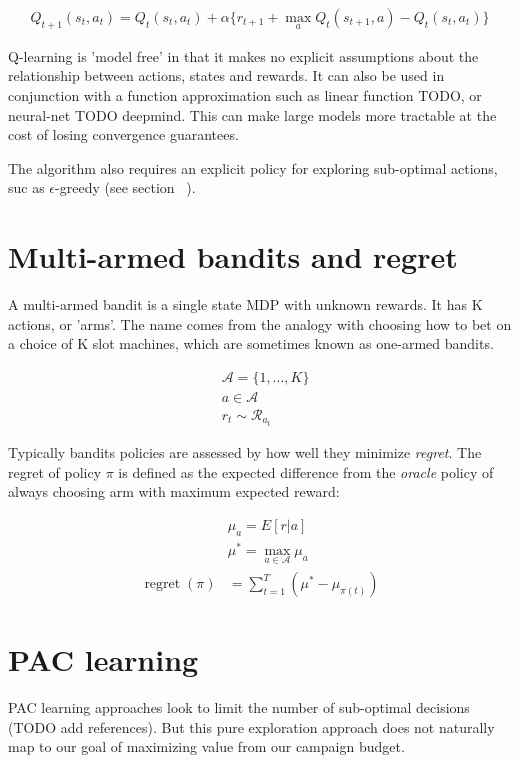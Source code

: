 \documentclass[11pt,a4,singlespacing,titlepagenumber=on]{scrreprt}
\numberwithin{equation}{chapter} %
\theoremstyle{remark}
\begin{document}
\begin{align}
Q_{t+1}(s_t,a_t) = Q_t(s_t,a_t) + \alpha\{r_{t+1} + \max_a Q_t(s_{t+1},a) -Q_t(s_t,a_t)\}
\end{align}

Q-learning is 'model free' in that it makes no explicit assumptions about the relationship between actions, states and rewards. It can also be used in conjunction with a function approximation such as linear function TODO, or neural-net TODO deepmind. This can make large models more tractable at the cost of losing convergence guarantees.

The algorithm also requires an explicit policy for exploring sub-optimal actions, suc as $\epsilon$-greedy (see section ~).

\section{ Multi-armed bandits and regret}

A multi-armed bandit is a single state MDP with unknown rewards. It has K actions, or 'arms'. The name comes from the analogy with choosing how to bet on a choice of K slot machines, which are sometimes known as one-armed bandits.

\begin{align}
&\mathcal{A} = \{1,...,K\} \\
&a \in \mathcal{A} \\
&r_t \sim \mathcal{R}_{a_t} 
\end{align}

Typically bandits policies are assessed by how well they minimize \textit{regret}. The regret of policy $\pi$ is defined as the expected difference from the \textit{oracle} policy of always choosing arm with maximum expected reward:

\begin{align}
&\mu_a = E[r|a] \\
&\mu^{*} = \max_{a \in \mathcal{A}} \mu_a \\
\operatorname{regret}(\pi) &= \sum_{t=1}^T (\mu^{*} - \mu_{\pi(t)})
\end{align}

\section{PAC learning}

PAC learning approaches look to limit the number of sub-optimal decisions (TODO add references). But this pure exploration approach does not naturally map to our goal of maximizing value from our campaign budget.
\end{document}
